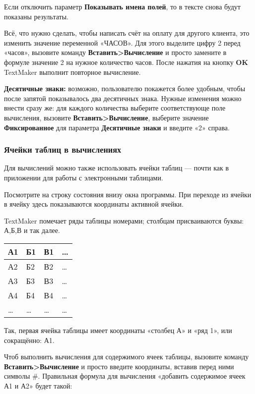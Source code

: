 ﻿\documentclass[a4paper,10pt]{article}
\begin{document}
Если отключить параметр \textbf{Показывать имена полей}, то в тексте снова будут показаны результаты. 

Всё, что нужно сделать, чтобы написать счёт на оплату для другого клиента, это изменить значение переменной «ЧАСОВ». Для этого выделите цифру 2 перед «часов», вызовите команду \textbf{Вставить>Вычисление} и просто замените в формуле значение 2 на нужное количество часов. После нажатия на кнопку \textbf{OK} TextMaker выполнит повторное вычисление.

\textbf{Десятичные знаки:} возможно, пользователю покажется более удобным, чтобы после запятой показывалось два десятичных знака. Нужные изменения можно внести сразу же: для каждого количества выберите соответствующе поле вычисления, вызовите \textbf{Вставить>Вычисление}, выберите значение \textbf{Фиксированное} для параметра \textbf{Десятичные знаки} и введите «2» справа.

\subsubsection{Ячейки таблиц в вычислениях}
Для вычислений можно также использовать ячейки таблиц — почти как в приложении для работы с электронными таблицами.

Посмотрите на строку состояния внизу окна программы. При переходе из ячейки в ячейку здесь показываются координаты активной ячейки.

TextMaker помечает ряды таблицы номерами; столбцам присваиваются буквы: А,Б,В и так далее.

\begin{center}
\begin{tabular}{ | m{1cm} | m{1cm} | m{1cm} | m{1cm} |}
\hline
 А1 & Б1 & В1 & …\\ 
 \hline
 А2 & Б2 & В2 & …\\
\hline
 А3 & Б3 & В3 & …\\
\hline
 А4 & Б4 & В4 & …\\
\hline
 … & … & … & …\\
\hline
\end{tabular}
\end{center}

Так, первая ячейка таблицы имеет координаты «столбец А» и «ряд 1», или сокращённо: А1.

Чтоб выполнить вычисления для содержимого ячеек таблицы, вызовите команду \textbf{Вставить>Вычисление} и просто введите координаты, вставив перед ними символы \#. Правильная формула для вычисления «добавить содержимое ячеек А1 и А2» будет такой:
\end{document}
